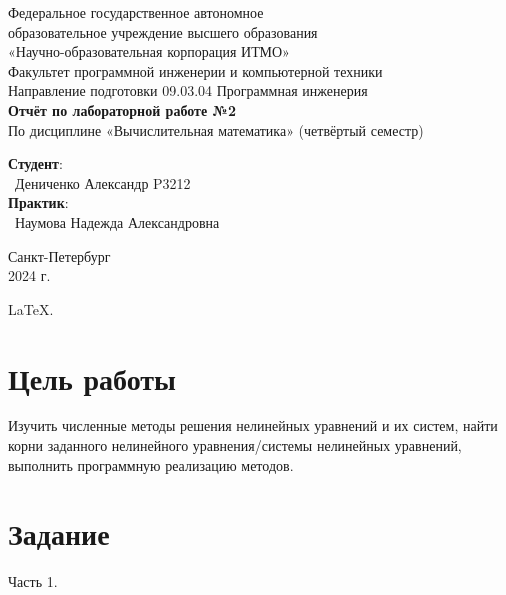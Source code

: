\documentclass{article}
\begin{document}
\begin{center}
    \Large
    Федеральное государственное автономное \\
    образовательное учреждение высшего образования \\ 
    «Научно-образовательная корпорация ИТМО»\\
    \vspace{0.5cm}
    \large
    Факультет программной инженерии и компьютерной техники \\
    Направление подготовки 09.03.04 Программная инженерия \\
    \vspace{1cm}
    \Large
    \textbf{Отчёт по лабораторной работе №2} \\
    По дисциплине «Вычислительная математика» (четвёртый семестр)\\
    \large
    \vspace{8cm}

    \begin{minipage}{.33\textwidth}
    \end{minipage}
    \hfill
    \begin{minipage}{.4\textwidth}
    
        \textbf{Студент}: \vspace{.1cm} \\
        \ Дениченко Александр P3212\\
        \textbf{Практик}:  \\
        \ Наумова Надежда Александровна
    \end{minipage}
    \vfill
Санкт-Петербург\\ 2024 г.
\end{center}

\newpage
\begin{center}
    \LARGE
    \color{pink}
    \LaTeX \color{lime}.
\end{center}

\section{Цель работы}

Изучить численные методы решения нелинейных уравнений и их
систем, найти корни заданного нелинейного уравнения/системы нелинейных уравнений,
выполнить программную реализацию методов.


\section{Задание}
Часть 1.
\end{document}
